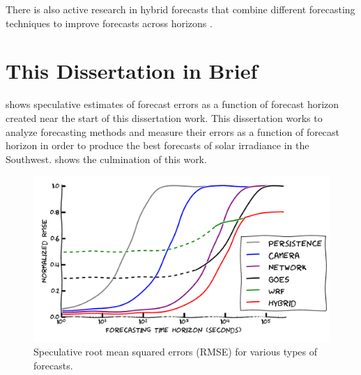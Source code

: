 There is also active research in hybrid forecasts that combine
different forecasting techniques to improve forecasts across horizons
\citep{Lu2015}.



\section{This Dissertation in Brief}

 shows speculative estimates of
forecast errors as a function of forecast horizon created near the
start of this dissertation work.
This dissertation works to analyze forecasting methods and measure
their errors as a function of forecast horizon in order to
produce the best forecasts of solar irradiance in the Southwest.
 shows the culmination of this work.

\begin{figure}[htbp]
\includegraphics[width=\textwidth]{figs/bullshit.pdf}
\caption[Speculative errors for various forecasting
techniques]{Speculative root mean squared errors (RMSE) for various
  types of forecasts.}
\label{fig:bullshitplot}
\end{figure}

